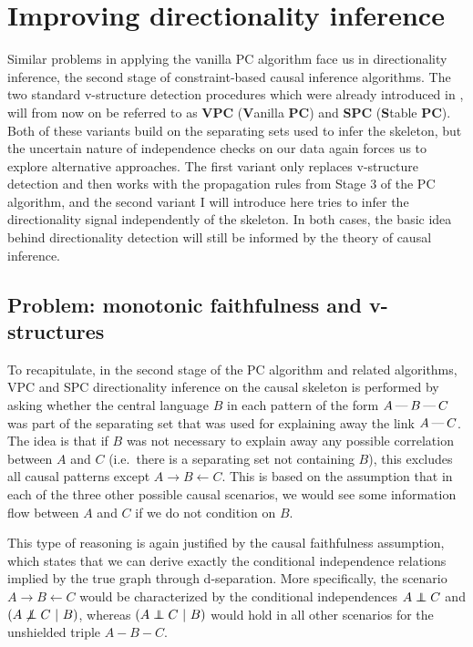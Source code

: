 \section{Improving directionality inference}\label{sec:6.5}
Similar problems in applying the vanilla PC algorithm face us in directionality inference, the second stage of constraint-based causal inference algorithms. The two standard v-structure detection procedures which were already introduced in , will from now on be referred to as \textbf{VPC} (\textbf{V}anilla \textbf{PC}) and \textbf{SPC} (\textbf{S}table \textbf{PC}). Both of these variants build on the separating sets used to infer the skeleton, but the uncertain nature of independence checks on our data again forces us to explore alternative approaches. The first variant only replaces v-structure detection and then works with the propagation rules from Stage 3 of the PC algorithm, and the second variant I will introduce here tries to infer the directionality signal independently of the skeleton. In both cases, the basic idea behind directionality detection will still be informed by the theory of causal inference.

\subsection{Problem: monotonic faithfulness and v-structures}
To recapitulate, in the second stage of the PC algorithm and related algorithms, VPC and SPC directionality inference on the causal skeleton is performed by asking whether the central language $B$ in each pattern of the form $A \kern 2pt\hbox{---}\kern 2pt B \kern 2pt\hbox{---}\kern 2pt C$ was part of the separating set that was used for explaining away the link $A \kern 2pt\hbox{---}\kern 2pt C$. The idea is that if $B$ was not necessary to explain away any possible correlation between $A$ and $C$ (i.e.\ there is a separating set not containing $B$), this excludes all causal patterns except $A \rightarrow B \leftarrow C$. This is based on the assumption that in each of the three other possible causal scenarios, we would see some information flow between $A$ and $C$ if we do not condition on $B$.

This type of reasoning is again justified by the causal faithfulness assumption, which states that we can derive exactly the conditional independence relations implied by the true graph through d-separation. More specifically, the scenario $A \rightarrow B \leftarrow C$ would be characterized by the conditional independences $A \indep C$ and $(A \not \indep C\ |\ B)$, whereas $(A \indep C\ |\ B)$ would hold in all other scenarios for the unshielded triple $A - B - C$.

